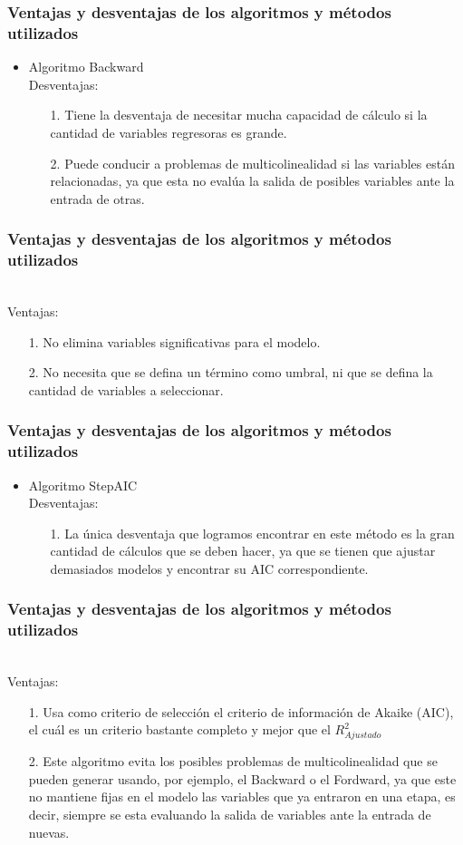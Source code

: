 \documentclass[12pt]{beamer}
\begin{document}
\begin{frame}
\frametitle{Ventajas y desventajas de los algoritmos y métodos utilizados}
\begin{itemize}
\item Algoritmo Backward
~\\ Desventajas:
\begin{itemize}
\item[1.] Tiene la desventaja de necesitar mucha capacidad de cálculo si la cantidad de variables regresoras es grande.
\item[2.] Puede conducir a problemas de multicolinealidad si las variables están relacionadas, ya que esta no evalúa la salida de posibles variables ante la entrada de otras.
\end{itemize}
\end{itemize}
\end{frame}

\begin{frame}
\frametitle{Ventajas y desventajas de los algoritmos y métodos utilizados}
~\\ Ventajas:
\begin{itemize}
\item[1.] No elimina variables significativas para el modelo.
\item[2.] No necesita que se defina un término como umbral, ni que se defina la cantidad de variables a seleccionar.
\end{itemize}
\end{frame}

\begin{frame}
\frametitle{Ventajas y desventajas de los algoritmos y métodos utilizados}
\begin{itemize}
\item Algoritmo StepAIC
~\\ Desventajas:
\begin{itemize}
\item[1.] La única desventaja que logramos encontrar en este método es la gran cantidad de cálculos que se deben hacer, ya que se tienen que ajustar demasiados modelos y encontrar su AIC correspondiente.
\end{itemize}
\end{itemize}
\end{frame}

\begin{frame}
\frametitle{Ventajas y desventajas de los algoritmos y métodos utilizados}
~\\ Ventajas:
\begin{itemize}
\item[1.] Usa como criterio de selección el criterio de información de Akaike (AIC), el cuál es un criterio bastante completo y mejor que el $R^2_{Ajustado}$
\item[2.] Este algoritmo evita los posibles problemas de multicolinealidad que se pueden generar usando, por ejemplo, el Backward o el Fordward, ya que este no mantiene fijas en el modelo las variables que ya entraron en una etapa, es decir, siempre se esta evaluando la salida de variables ante la entrada de nuevas.
\end{itemize}
\end{frame}
\end{document}
